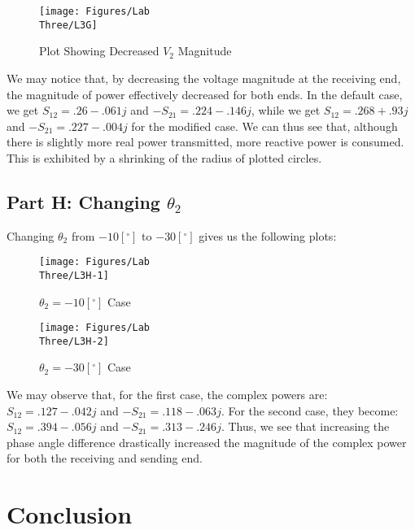 \documentclass[
	letterpaper, %
	10pt, %
]{CSUniSchoolLabReport}
\begin{document}
\begin{figure}[H]
  \centering
  \texttt{[image: Figures/Lab\\ Three/L3G]}
  \caption{Plot Showing Decreased $V_2$ Magnitude}
  \label{fig:12}
\end{figure}

We may notice that, by decreasing the voltage magnitude at the receiving end, the magnitude of power effectively decreased for both ends. In the default case, we get $S_{12}=.26-.061j$ and $-S_{21}=.224-.146j$, while we get $S_{12}=.268+.93j$ and $-S_{21}=.227-.004j$ for the modified case. We can thus see that, although there is slightly more real power transmitted, more reactive power is consumed. This is exhibited by a shrinking of the radius of plotted circles.

\subsection{Part H: Changing $\theta_2$}

Changing $\theta_2$ from $-10[^{\circ}]$ to $-30[^{\circ}]$ gives us the following plots:

\begin{figure}[H]
  \centering
  \texttt{[image: Figures/Lab\\ Three/L3H-1]}
  \caption{$\theta_2=-10[^{\circ}]$ Case}
  \label{fig:13}
\end{figure}

\begin{figure}[H]
  \centering
  \texttt{[image: Figures/Lab\\ Three/L3H-2]}
  \caption{$\theta_2=-30[^{\circ}]$ Case}
  \label{fig:14}
\end{figure}

We may observe that, for the first case, the complex powers are: $S_{12}=.127-.042j$ and $-S_{21}=.118-.063j$. For the second case, they become: $S_{12}=.394-.056j$ and $-S_{21}=.313-.246j$. Thus, we see that increasing the phase angle difference drastically increased the magnitude of the complex power for both the receiving and sending end.

\section{Conclusion}
\end{document}
